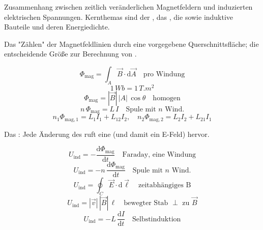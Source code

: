 

\begin{runintext}
Zusammenhang zwischen zeitlich veränderlichen Magnetfeldern und induzierten elektrischen Spannungen. Kernthemas sind der , das , die  sowie induktive Bauteile und deren Energiedichte.
\end{runintext}

\begin{runintext}
Das "Zählen" der Magnetfeldlinien durch eine vorgegebene Querschnittsfläche; die entscheidende Größe zur Berechnung von .
\end{runintext}
\begin{formulabox}
\[ \Phi_{\mathrm{mag}} = \int_A \vec{B}\cdot\mathrm{d}\vec{A} \quad \text{pro Windung} \]
\formulasep
\[ 1\,\si{Wb} = 1\,\si{T.m^2} \]
\[ \Phi_{\mathrm{mag}} = |\vec{B}|\,|A|\,\cos\theta \quad \text{homogen} \]
\formulasep
\[ n\,\Phi_{\mathrm{mag}} = L\,I \quad \text{Spule mit $n$ Wind.} \]
\[ n_1\Phi_{\mathrm{mag},1} = L_1 I_1 + L_{12} I_2,\quad n_2\Phi_{\mathrm{mag},2} = L_2 I_2 + L_{21} I_1 \]
\end{formulabox}

\begin{runintext}
Das : Jede Änderung des  ruft eine  (und damit ein E-Feld) hervor.
\end{runintext}


\begin{formulabox}
\[ U_{\mathrm{ind}} = -\frac{\mathrm{d}\Phi_{\mathrm{mag}}}{\mathrm{d}t} \quad \text{Faraday, eine Windung} \]
\[ U_{\mathrm{ind}} = -n\,\frac{\mathrm{d}\Phi_{\mathrm{mag}}}{\mathrm{d}t} \quad \text{Spule mit $n$ Wind.} \]
\formulasep
\[ U_{\mathrm{ind}} = \oint_C \vec{E}\cdot\mathrm{d}\vec{\ell} \quad \text{zeitabhängiges B} \]
\formulasep
\[ U_{\mathrm{ind}} = |\vec{v}|\,|\vec{B}|\,\ell \quad \text{bewegter Stab $\perp$ zu $\vec{B}$} \]
\formulasep
\[ U_{\mathrm{ind}} = -L\,\frac{\mathrm{d}I}{\mathrm{d}t} \quad \text{Selbstinduktion} \]
\end{formulabox}

